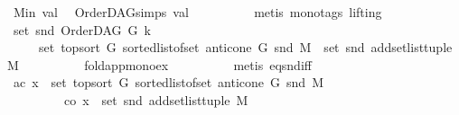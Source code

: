 \begin{isabellebody}
\ M{\isacharunderscore}{\kern0pt}in\ val\ \isamarkupfalse%
\ OrderDAG{\isachardot}{\kern0pt}simps\ val\isanewline
\ \ \ \ \ \ \ \ \isamarkupfalse%
\ {\isacharparenleft}{\kern0pt}metis\ {\isacharparenleft}{\kern0pt}mono{\isacharunderscore}{\kern0pt}tags{\isacharcomma}{\kern0pt}\ lifting{\isacharparenright}{\kern0pt}{\isacharparenright}{\kern0pt}\ \isanewline
\ \ \ \ \ \ \isamarkupfalse%
\ \isamarkupfalse%
\ {\isachardoublequoteopen}set\ {\isacharparenleft}{\kern0pt}snd\ {\isacharparenleft}{\kern0pt}OrderDAG\ G\ k{\isacharparenright}{\kern0pt}{\isacharparenright}{\kern0pt}\ \isanewline
\ \ \ \ {\isacharequal}{\kern0pt}\ set\ {\isacharparenleft}{\kern0pt}top{\isacharunderscore}{\kern0pt}sort\ G\ {\isacharparenleft}{\kern0pt}sorted{\isacharunderscore}{\kern0pt}list{\isacharunderscore}{\kern0pt}of{\isacharunderscore}{\kern0pt}set\ {\isacharparenleft}{\kern0pt}anticone\ G\ {\isacharparenleft}{\kern0pt}snd\ M{\isacharparenright}{\kern0pt}{\isacharparenright}{\kern0pt}{\isacharparenright}{\kern0pt}{\isacharparenright}{\kern0pt}\ {\isasymunion}\ set\ {\isacharparenleft}{\kern0pt}snd\ {\isacharparenleft}{\kern0pt}add{\isacharunderscore}{\kern0pt}set{\isacharunderscore}{\kern0pt}list{\isacharunderscore}{\kern0pt}tuple\ M{\isacharparenright}{\kern0pt}{\isacharparenright}{\kern0pt}{\isachardoublequoteclose}\isanewline
\ \ \ \ \ \ \ \ \isamarkupfalse%
\ fold{\isacharunderscore}{\kern0pt}app{\isacharunderscore}{\kern0pt}mono{\isacharunderscore}{\kern0pt}ex\isanewline
\ \ \ \ \ \ \ \ \isamarkupfalse%
\ {\isacharparenleft}{\kern0pt}metis\ eq{\isacharunderscore}{\kern0pt}snd{\isacharunderscore}{\kern0pt}iff{\isacharparenright}{\kern0pt}\isanewline
\ \ \ \ \ \ \isamarkupfalse%
\ \isamarkupfalse%
\ {\isacharparenleft}{\kern0pt}ac{\isacharparenright}{\kern0pt}\ {\isachardoublequoteopen}x\ {\isasymin}\ set\ {\isacharparenleft}{\kern0pt}top{\isacharunderscore}{\kern0pt}sort\ G\ {\isacharparenleft}{\kern0pt}sorted{\isacharunderscore}{\kern0pt}list{\isacharunderscore}{\kern0pt}of{\isacharunderscore}{\kern0pt}set\ {\isacharparenleft}{\kern0pt}anticone\ G\ {\isacharparenleft}{\kern0pt}snd\ M{\isacharparenright}{\kern0pt}{\isacharparenright}{\kern0pt}{\isacharparenright}{\kern0pt}{\isacharparenright}{\kern0pt}{\isachardoublequoteclose}\ \isanewline
\ \ \ \ \ \ \ \ {\isacharbar}{\kern0pt}\ {\isacharparenleft}{\kern0pt}co{\isacharparenright}{\kern0pt}\ {\isachardoublequoteopen}x\ {\isasymin}\ set\ {\isacharparenleft}{\kern0pt}snd\ {\isacharparenleft}{\kern0pt}add{\isacharunderscore}{\kern0pt}set{\isacharunderscore}{\kern0pt}list{\isacharunderscore}{\kern0pt}tuple\ M{\isacharparenright}{\kern0pt}{\isacharparenright}{\kern0pt}{\isachardoublequoteclose}\ \isanewline

\end{isabellebody}
